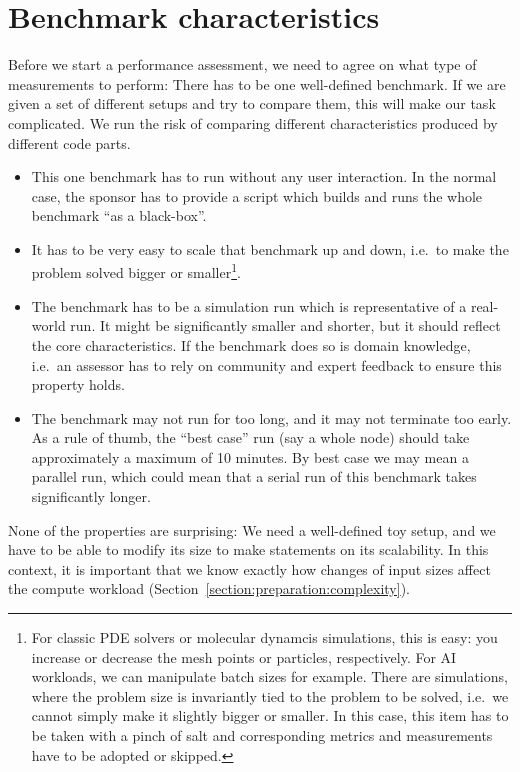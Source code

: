 \section{Benchmark characteristics}
\label{section:preparation:benchmarks}

Before we start a performance assessment, we need to agree on what type of measurements to perform:
There has to be one well-defined benchmark. 
If we are given a set of different setups and try to compare them, this will make our task complicated. 
We run the risk of comparing different characteristics produced by different code parts.

\begin{itemize}
  \item This one benchmark has to run without any user interaction. In the
    normal case, the sponsor has to provide a script which builds and runs the
    whole benchmark ``as a black-box''.
  \item It has to be very easy to scale that benchmark up and down, i.e.~to make the problem solved bigger or smaller\footnote{
   For classic PDE solvers or molecular dynamcis simulations, this is easy: 
   you increase or decrease the mesh points or particles, respectively.
   For AI workloads, we can manipulate batch sizes for example.
   There are simulations, where the problem size is invariantly tied to the problem to be solved, i.e.~we cannot simply make it slightly bigger or smaller.
   In this case, this item has to be taken with a pinch of salt and corresponding metrics and measurements have to be adopted or skipped. 
  }. 
  \item The benchmark has to be a simulation run which is representative of a real-world run.
    It might be significantly smaller and shorter, but it should reflect the core characteristics.
    If the benchmark does so is domain knowledge, i.e.~an assessor has to rely on community and expert feedback to ensure this property holds.
  \item The benchmark may not run for too long, and it may not terminate too early. As a rule of thumb, the ``best case'' run (say a whole node) should take approximately a maximum of 10 minutes. By best case we may mean a parallel run, which could mean that a serial run of this benchmark takes significantly longer.
\end{itemize}

\noindent
None of the properties are surprising:
We need a well-defined toy setup, and we have to be able to modify its size to make statements on its scalability.
In this context, it is important that we know exactly how changes of input sizes affect the compute workload (Section~\ref{section:preparation:complexity}).


